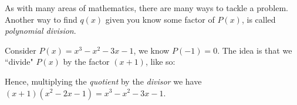 As with many areas of mathematics, there are many ways to tackle a problem. Another way to find $q(x)$ given you know some factor of $P(x)$, is called {\it polynomial division}.
\begin{example}
Consider $P(x)=x^3-x^2-3x-1$, we know $P(-1)=0$. The idea is that we ``divide" $P(x)$ by the factor $(x+1)$, like so:\\[1em]
\begin{center}
\end{center}
Hence, multiplying the {\it quotient} by the {\it divisor} we have $(x+1)(x^2-2x-1)=x^3-x^2-3x-1$. 
\end{example}

